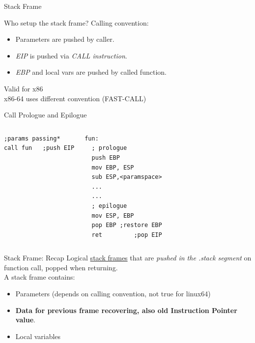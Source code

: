 \begin{frame}{Stack Frame}
\begin{block}{Who setup the stack frame?}
Calling convention:
\begin{itemize}
\item Parameters are pushed by caller.
\item \emph{EIP} is pushed via \emph{CALL instruction}.
\item \emph{EBP} and local vars are pushed by called function.
\end{itemize}
\hfill \tiny Valid for x86\\
\hfill x86-64 uses different convention (FAST-CALL)
\end{block}

\framebreak

\begin{block}{Call Prologue and Epilogue}
\begin{columns}[c] 
    \acode
    \tiny
\begin{lstlisting}
;params passing*
call fun   ;push EIP
\end{lstlisting}
     \acode
     \tiny
\begin{lstlisting}
fun:
  ; prologue
  push EBP
  mov EBP, ESP
  sub ESP,<paramspace>
  ...
  ...
  ; epilogue
  mov ESP, EBP
  pop EBP ;restore EBP
  ret         ;pop EIP
\end{lstlisting}
\end{columns}
\end{block}

\framebreak

\begin{block}{Stack Frame: Recap}
Logical \underline{stack frames} that are \emph{pushed in the .stack segment} on function call, popped when returning.\\
A stack frame contains:
\begin{itemize}
\item Parameters (depends on calling convention, not true for linux64)
\item {\bf Data for previous frame recovering, also old Instruction Pointer value}.
\item Local variables
\end{itemize}
\end{block}

\framebreak


\end{frame}
